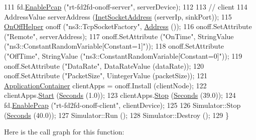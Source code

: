 \begin{DoxyCode}
111   fd.\hyperlink{classns3_1_1PcapHelperForDevice_a74866def9a881aa9d5c5be1225a26722}{EnablePcap} (\textcolor{stringliteral}{"rt-fd2fd-onoff-server"}, serverDevice);
112 
113   \textcolor{comment}{// client}
114   AddressValue serverAddress (\hyperlink{classns3_1_1InetSocketAddress}{InetSocketAddress} (serverIp, sinkPort));
115   \hyperlink{classns3_1_1OnOffHelper}{OnOffHelper} onoff (\textcolor{stringliteral}{"ns3::TcpSocketFactory"}, \hyperlink{classns3_1_1Address}{Address} ());
116   onoff.SetAttribute (\textcolor{stringliteral}{"Remote"}, serverAddress);
117   onoff.SetAttribute (\textcolor{stringliteral}{"OnTime"}, StringValue (\textcolor{stringliteral}{"ns3::ConstantRandomVariable[Constant=1]"}));
118   onoff.SetAttribute (\textcolor{stringliteral}{"OffTime"}, StringValue (\textcolor{stringliteral}{"ns3::ConstantRandomVariable[Constant=0]"}));
119   onoff.SetAttribute (\textcolor{stringliteral}{"DataRate"}, DataRateValue (dataRate));
120   onoff.SetAttribute (\textcolor{stringliteral}{"PacketSize"}, UintegerValue (packetSize));
121   \hyperlink{classns3_1_1ApplicationContainer}{ApplicationContainer} clientApps = onoff.Install (clientNode);
122   clientApps.\hyperlink{classns3_1_1ApplicationContainer_a8eff87926507020bbe3e1390358a54a7}{Start} (\hyperlink{group__timecivil_ga33c34b816f8ff6628e33d5c8e9713b9e}{Seconds} (1.0));
123   clientApps.\hyperlink{classns3_1_1ApplicationContainer_adfc52f9aa4020c8714679b00bbb9ddb3}{Stop} (\hyperlink{group__timecivil_ga33c34b816f8ff6628e33d5c8e9713b9e}{Seconds} (39.0));
124   fd.\hyperlink{classns3_1_1PcapHelperForDevice_a74866def9a881aa9d5c5be1225a26722}{EnablePcap} (\textcolor{stringliteral}{"rt-fd2fd-onoff-client"}, clientDevice);
125 
126   Simulator::Stop (\hyperlink{group__timecivil_ga33c34b816f8ff6628e33d5c8e9713b9e}{Seconds} (40.0));
127   Simulator::Run ();
128   Simulator::Destroy ();
129 \}
\end{DoxyCode}


Here is the call graph for this function\+:


